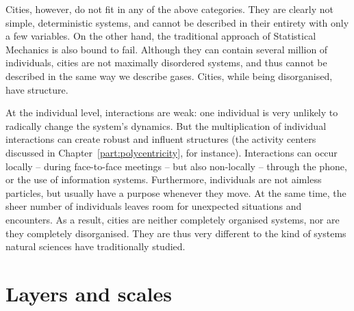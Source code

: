 Cities, however, do not fit in any of the above categories. They are clearly not
simple, deterministic systems, and cannot be described in their entirety with
only a few variables. On the other hand, the traditional approach of Statistical
Mechanics is also bound to fail. Although they can contain several million of
individuals, cities are not maximally disordered systems, and thus cannot be
described in the same way we describe gases. Cities, while being disorganised,
have structure. 

At the individual level, interactions are weak: one individual is very unlikely
to radically change the system's dynamics. But the multiplication of individual
interactions can create robust and influent structures (the activity centers
discussed in Chapter~\ref{part:polycentricity}, for instance). Interactions can
occur locally -- during face-to-face meetings -- but also non-locally
 -- through the phone, or the use of information systems. Furthermore,
individuals are not aimless particles, but usually have a purpose whenever they
move. At the same time, the sheer number of individuals leaves room for unexpected situations
and encounters. As a result, cities are neither completely organised systems,
nor are they completely disorganised. They are thus very different to the
kind of systems natural sciences have traditionally studied. 





\section{Layers and scales}
\label{sub:layers_and_scales}

